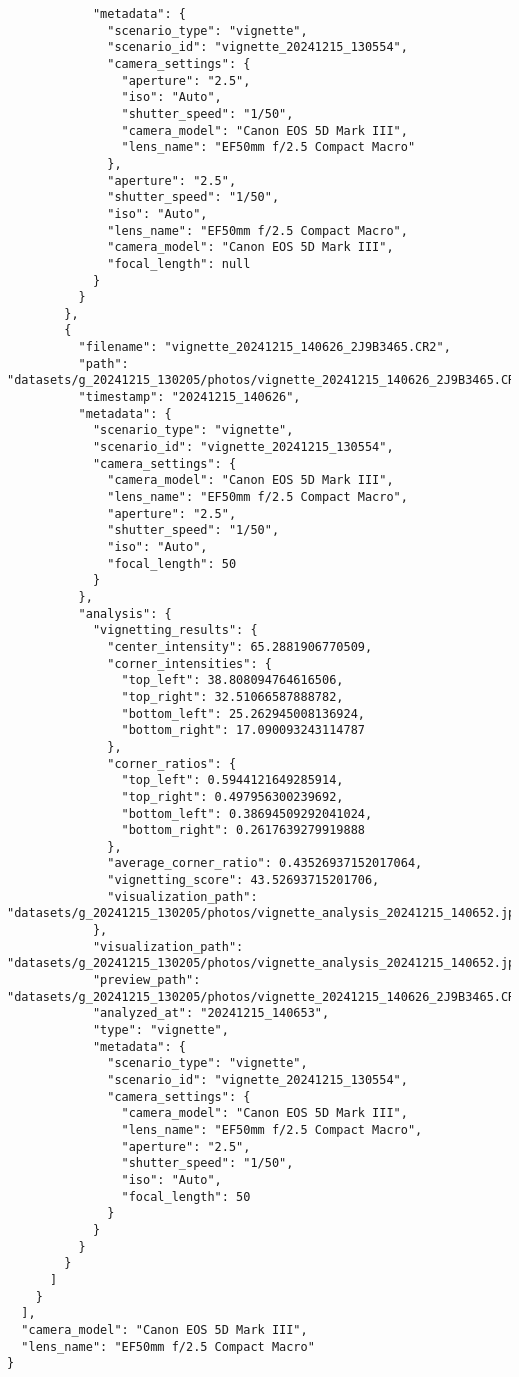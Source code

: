 \begin{verbatim}
            "metadata": {
              "scenario_type": "vignette",
              "scenario_id": "vignette_20241215_130554",
              "camera_settings": {
                "aperture": "2.5",
                "iso": "Auto",
                "shutter_speed": "1/50",
                "camera_model": "Canon EOS 5D Mark III",
                "lens_name": "EF50mm f/2.5 Compact Macro"
              },
              "aperture": "2.5",
              "shutter_speed": "1/50",
              "iso": "Auto",
              "lens_name": "EF50mm f/2.5 Compact Macro",
              "camera_model": "Canon EOS 5D Mark III",
              "focal_length": null
            }
          }
        },
        {
          "filename": "vignette_20241215_140626_2J9B3465.CR2",
          "path": "datasets/g_20241215_130205/photos/vignette_20241215_140626_2J9B3465.CR2",
          "timestamp": "20241215_140626",
          "metadata": {
            "scenario_type": "vignette",
            "scenario_id": "vignette_20241215_130554",
            "camera_settings": {
              "camera_model": "Canon EOS 5D Mark III",
              "lens_name": "EF50mm f/2.5 Compact Macro",
              "aperture": "2.5",
              "shutter_speed": "1/50",
              "iso": "Auto",
              "focal_length": 50
            }
          },
          "analysis": {
            "vignetting_results": {
              "center_intensity": 65.2881906770509,
              "corner_intensities": {
                "top_left": 38.808094764616506,
                "top_right": 32.51066587888782,
                "bottom_left": 25.262945008136924,
                "bottom_right": 17.090093243114787
              },
              "corner_ratios": {
                "top_left": 0.5944121649285914,
                "top_right": 0.497956300239692,
                "bottom_left": 0.38694509292041024,
                "bottom_right": 0.2617639279919888
              },
              "average_corner_ratio": 0.43526937152017064,
              "vignetting_score": 43.52693715201706,
              "visualization_path": "datasets/g_20241215_130205/photos/vignette_analysis_20241215_140652.jpg"
            },
            "visualization_path": "datasets/g_20241215_130205/photos/vignette_analysis_20241215_140652.jpg",
            "preview_path": "datasets/g_20241215_130205/photos/vignette_20241215_140626_2J9B3465.CR2",
            "analyzed_at": "20241215_140653",
            "type": "vignette",
            "metadata": {
              "scenario_type": "vignette",
              "scenario_id": "vignette_20241215_130554",
              "camera_settings": {
                "camera_model": "Canon EOS 5D Mark III",
                "lens_name": "EF50mm f/2.5 Compact Macro",
                "aperture": "2.5",
                "shutter_speed": "1/50",
                "iso": "Auto",
                "focal_length": 50
              }
            }
          }
        }
      ]
    }
  ],
  "camera_model": "Canon EOS 5D Mark III",
  "lens_name": "EF50mm f/2.5 Compact Macro"
}
\end{verbatim}


